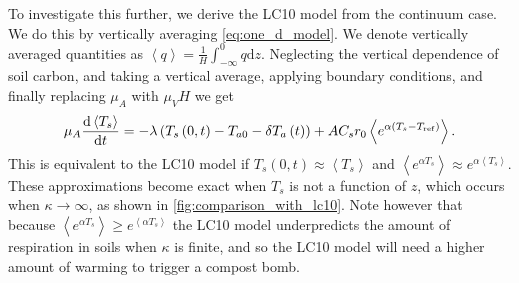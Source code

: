 To investigate this further, we derive  the LC10 model from the continuum case. We do this by vertically averaging \cref{eq:one_d_model}.
We denote vertically averaged quantities as
$\left\langle q \right\rangle = \frac{1}{H}\int_{-\infty}^0 q \mathrm{d}z$. Neglecting the vertical dependence of soil carbon, and
taking a vertical average, applying boundary conditions, and finally replacing $\mu_A$ with $\mu_V H$ we get
\begin{equation}
  \label{eq:vertically_averaged}
  \mu_A \dv{\left\langle T_s \right\rangle}{t} = -\lambda \left( T_s\left(0,t\right) - T_{a0} - \delta T_a\left(t\right)\right) + AC_sr_0\left\langle e^{\alpha \left(T_s - T_{\mathrm{ref}}\right)}\right\rangle.
\end{equation}
This is equivalent to the LC10 model if $T_s(0,t) \approx \left\langle T_s \right\rangle$ and $\left\langle e^{\alpha T_s}\right\rangle \approx e^{\alpha \left\langle T_s \right\rangle}$. These approximations become exact
when $T_s$ is not a function of $z$, which occurs when $\kappa \rightarrow \infty$, as shown in \cref{fig:comparison_with_lc10}.
Note however that because $\left\langle e^{\alpha T_s} \right\rangle \ge e^{\left\langle \alpha T_s \right\rangle}$ the LC10 model underpredicts the amount of respiration
in soils when $\kappa$ is finite, and so the LC10 model will need a higher amount of warming to trigger a compost bomb.

  

